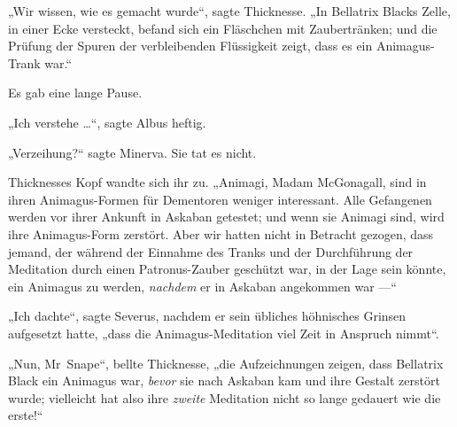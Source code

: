 „Wir wissen, wie es gemacht wurde“, sagte Thicknesse.
„In Bellatrix Blacks Zelle, in einer Ecke versteckt, befand sich ein Fläschchen mit Zaubertränken; und die Prüfung der Spuren der verbleibenden Flüssigkeit zeigt, dass es ein Animagus-Trank war.“

Es gab eine lange Pause.

„Ich verstehe …“, sagte Albus heftig.

„Verzeihung?“ sagte Minerva. Sie tat es nicht.

Thicknesses Kopf wandte sich ihr zu.
„Animagi, Madam McGonagall, sind in ihren Animagus-Formen für Dementoren weniger interessant. Alle Gefangenen werden vor ihrer Ankunft in Askaban getestet; und wenn sie Animagi sind, wird ihre Animagus-Form zerstört. Aber wir hatten nicht in Betracht gezogen, dass jemand, der während der Einnahme des Tranks und der Durchführung der Meditation durch einen Patronus-Zauber geschützt war, in der Lage sein könnte, ein Animagus zu werden, \emph{nachdem} er in Askaban angekommen war —“

„Ich dachte“, sagte Severus, nachdem er sein übliches höhnisches Grinsen aufgesetzt hatte, „dass die Animagus-Meditation viel Zeit in Anspruch nimmt“.

„Nun, Mr~Snape“, bellte Thicknesse, „die Aufzeichnungen zeigen, dass Bellatrix Black ein Animagus war, \emph{bevor} sie nach Askaban kam und ihre Gestalt zerstört wurde; vielleicht hat also ihre \emph{zweite} Meditation nicht so lange gedauert wie die erste!“

